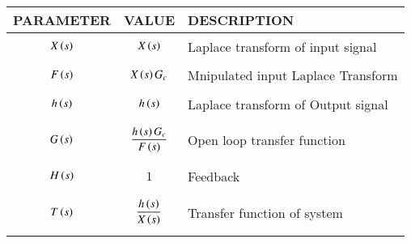 \begin{tabular}{|p{2cm}|p{2cm}|p{3.9cm}|}
    \hline
    PARAMETER & VALUE & DESCRIPTION   \\ \hline
    $$X\left(s\right)$$ & $$X\left(s\right)$$ & Laplace transform of input signal  \\ \hline
    $$F\left(s\right)$$ & $$X\left(s\right)G_c$$ & Mnipulated input Laplace Transform \\ \hline
    $$h\left(s\right)$$ & $$h\left(s\right)$$ & Laplace transform of Output signal  \\ \hline
    $$G\left(s\right)$$ & $$\frac{h\left(s\right)G_c}{F\left(s\right)}$$ & Open loop transfer function    \\ \hline
    $$H\left(s\right)$$ & $$1$$ & Feedback  \\ \hline
    $$T\left(s\right)$$ & $$\frac{h\left(s\right)}{X\left(s\right)}$$ & Transfer function of system   \\ \hline
\end{tabular}
